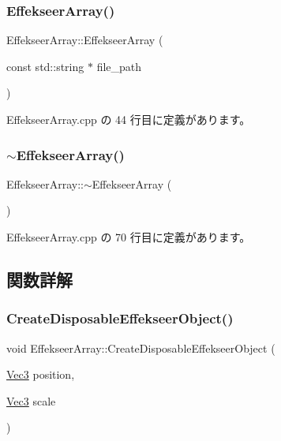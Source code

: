 \subsubsection{\texorpdfstring{Effekseer\+Array()}{EffekseerArray()}}
{\footnotesize\ttfamily Effekseer\+Array\+::\+Effekseer\+Array (\begin{DoxyParamCaption}\item[{const std\+::string $\ast$}]{file\+\_\+path }\end{DoxyParamCaption})}



 Effekseer\+Array.\+cpp の 44 行目に定義があります。

\mbox{\label{class_effekseer_array_af5e7c360c77737f0c46b3a9dad2725ac}} 
\subsubsection{\texorpdfstring{$\sim$\+Effekseer\+Array()}{~EffekseerArray()}}
{\footnotesize\ttfamily Effekseer\+Array\+::$\sim$\+Effekseer\+Array (\begin{DoxyParamCaption}{ }\end{DoxyParamCaption})}



 Effekseer\+Array.\+cpp の 70 行目に定義があります。



\subsection{関数詳解}
\mbox{\label{class_effekseer_array_a8c86aa79851ef86f253c13765f708383}} 
\subsubsection{\texorpdfstring{Create\+Disposable\+Effekseer\+Object()}{CreateDisposableEffekseerObject()}}
{\footnotesize\ttfamily void Effekseer\+Array\+::\+Create\+Disposable\+Effekseer\+Object (\begin{DoxyParamCaption}\item[{\mbox{\hyperlink{_vector3_d_8h_ab16f59e4393f29a01ec8b9bbbabbe65d}{Vec3}}}]{position,  }\item[{\mbox{\hyperlink{_vector3_d_8h_ab16f59e4393f29a01ec8b9bbbabbe65d}{Vec3}}}]{scale }\end{DoxyParamCaption})}



